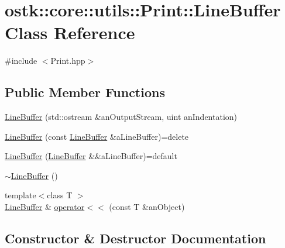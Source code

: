 \hypertarget{classostk_1_1core_1_1utils_1_1_print_1_1_line_buffer}{}\section{ostk\+:\+:core\+:\+:utils\+:\+:Print\+:\+:Line\+Buffer Class Reference}
\label{classostk_1_1core_1_1utils_1_1_print_1_1_line_buffer}


{\ttfamily \#include $<$Print.\+hpp$>$}

\subsection*{Public Member Functions}
\begin{DoxyCompactItemize}
\item 
\hyperlink{classostk_1_1core_1_1utils_1_1_print_1_1_line_buffer_a068be8d7623e32d2d1cbe11c42ecd1bb}{Line\+Buffer} (std\+::ostream \&an\+Output\+Stream, uint an\+Indentation)
\item 
\hyperlink{classostk_1_1core_1_1utils_1_1_print_1_1_line_buffer_a2e4d7000658fc88f76dfee037ef12adb}{Line\+Buffer} (const \hyperlink{classostk_1_1core_1_1utils_1_1_print_1_1_line_buffer}{Line\+Buffer} \&a\+Line\+Buffer)=delete
\item 
\hyperlink{classostk_1_1core_1_1utils_1_1_print_1_1_line_buffer_ae41cb4c25cf9091302402efb6e221f68}{Line\+Buffer} (\hyperlink{classostk_1_1core_1_1utils_1_1_print_1_1_line_buffer}{Line\+Buffer} \&\&a\+Line\+Buffer)=default
\item 
\hyperlink{classostk_1_1core_1_1utils_1_1_print_1_1_line_buffer_a4e41e82cf1085cdb1db3289b58305526}{$\sim$\+Line\+Buffer} ()
\item 
{\footnotesize template$<$class T $>$ }\\\hyperlink{classostk_1_1core_1_1utils_1_1_print_1_1_line_buffer}{Line\+Buffer} \& \hyperlink{classostk_1_1core_1_1utils_1_1_print_1_1_line_buffer_ac7609b62d8623d0f8717acc4c5102faf}{operator$<$$<$} (const T \&an\+Object)
\end{DoxyCompactItemize}


\subsection{Constructor \& Destructor Documentation}
\mbox{\label{classostk_1_1core_1_1utils_1_1_print_1_1_line_buffer_a068be8d7623e32d2d1cbe11c42ecd1bb}} 
